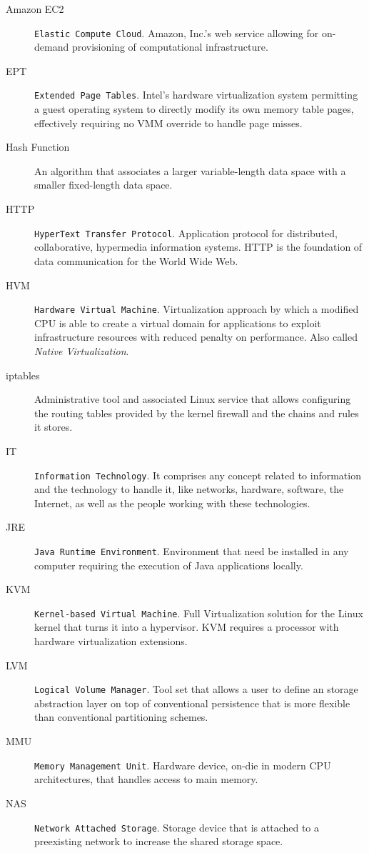 \begin{description}
\item[Amazon EC2] \texttt{Elastic Compute Cloud}. Amazon, Inc.'s web service allowing for on-demand provisioning of computational infrastructure.
\item[EPT] \texttt{Extended Page Tables}. Intel's hardware virtualization system permitting a guest operating system to directly modify its own memory table pages, effectively requiring no VMM override to handle page misses.
\item[Hash Function] An algorithm that associates a larger variable-length data space with a smaller fixed-length data space.
\item[HTTP] \texttt{HyperText Transfer Protocol}. Application protocol for distributed, collaborative, hypermedia information systems. HTTP is the foundation of data communication for the World Wide Web.
\item[HVM] \texttt{Hardware Virtual Machine}. Virtualization approach by which a modified CPU is able to create a virtual domain for applications to exploit infrastructure resources with reduced penalty on performance. Also called \emph{Native Virtualization}.
\item[iptables] Administrative tool and associated Linux service that allows configuring the routing tables provided by the kernel firewall and the chains and rules it stores.
\item[IT] \texttt{Information Technology}. It comprises any concept related to information and the technology to handle it, like networks, hardware, software, the Internet, as well as the people working with these technologies.
\item[JRE] \texttt{Java Runtime Environment}. Environment that need be installed in any computer requiring the execution of Java applications locally.
\item[KVM] \texttt{Kernel-based Virtual Machine}. Full Virtualization solution for the Linux kernel that turns it into a hypervisor. KVM requires a processor with hardware virtualization extensions.
\item[LVM] \texttt{Logical Volume Manager}. Tool set that allows a user to define an storage abstraction layer on top of conventional persistence that is more flexible than conventional partitioning schemes.
\item[MMU] \texttt{Memory Management Unit}. Hardware device, on-die in modern CPU architectures, that handles access to main memory.
\item[NAS] \texttt{Network Attached Storage}. Storage device that is attached to a preexisting network to increase the shared storage space.

\end{description}
